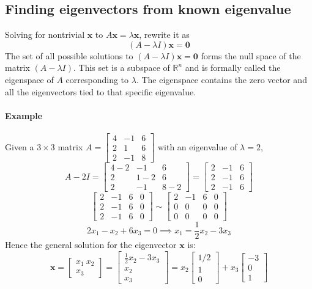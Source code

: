 \documentclass[../linear-algebra.tex]{subfiles}
\begin{document}
\subsection{Finding eigenvectors from known eigenvalue}
Solving for nontrivial $\mathbf{x}$ to $A\mathbf{x} = \lambda\mathbf{x}$, rewrite it as
$$(A-\lambda I)\mathbf{x}=\mathbf{0}$$
The set of all possible solutions to $(A-\lambda I)\mathbf{x}=\mathbf{0}$ forms the null space of the matrix $(A-\lambda I)$. This set is a subspace of $\mathbb{R}^n$ and is formally called the eigenspace of $A$ corresponding to $\lambda$.
The eigenspace contains the zero vector and all the eigenvectors tied to that specific eigenvalue.
\paragraph{Example} Given a $3 \times 3$ matrix $A = \begin{bmatrix}4 & -1 & 6 \\ 2 & 1 & 6 \\ 2 & -1 & 8\end{bmatrix}$ with an eigenvalue of $\lambda=2$,
$$A - 2I = \begin{bmatrix} 4-2 & -1 & 6 \\ 2 & 1-2 & 6 \\ 2 & -1 & 8-2 \end{bmatrix} = \begin{bmatrix} 2 & -1 & 6 \\ 2 & -1 & 6 \\ 2 & -1 & 6 \end{bmatrix}$$
$$\left[ \begin{array}{ccc|c} 2 & -1 & 6 & 0 \\ 2 & -1 & 6 & 0 \\ 2 & -1 & 6 & 0 \end{array} \right] \sim \left[ \begin{array}{ccc|c} 2 & -1 & 6 & 0 \\ 0 & 0 & 0 & 0 \\ 0 & 0 & 0 & 0 \end{array} \right]$$
$$2x_1 - x_2 + 6x_3 = 0 \implies x_1 = \frac{1}{2}x_2 - 3x_3$$
Hence the general solution for the eigenvector $\mathbf{x}$ is:
$$\mathbf{x} = \begin{bmatrix} x_1 \ x_2 \\ x_3 \end{bmatrix} = \begin{bmatrix} \frac{1}{2}x_2 - 3x_3 \\ x_2 \\ x_3 \end{bmatrix} = x_2 \begin{bmatrix} 1/2 \\ 1 \\ 0 \end{bmatrix} + x_3 \begin{bmatrix} -3 \\ 0 \\ 1 \end{bmatrix}$$
\end{document}
